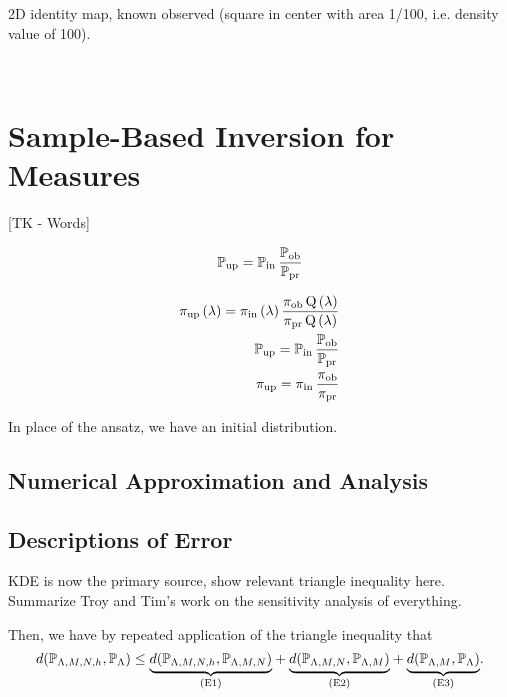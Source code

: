 2D identity map, known observed (square in center with area 1/100, i.e. density value of 100).

\vspace{3in}




\
\section{Sample-Based Inversion for Measures}\label{sec:ch02-sample}
[TK - Words]

\begin{equation}
\operatorname*{\mathbb{P}_{up}} = \operatorname*{\mathbb{P}_{in}} \frac{\operatorname*{\mathbb{P}_{ob}}}{\operatorname*{\mathbb{P}_{pr}}}
\end{equation}

\begin{equation}
\begin{split}
\operatorname*{\operatorname*{\pi_{up}}\left ( \lambda \right ) = \operatorname*{\pi_{in}}\left ( \lambda \right ) \frac{\operatorname*{\pi_{ob}}Q\left ( \lambda \right )}{\operatorname*{\pi_{pr}}Q\left ( \lambda \right )}}\\
\operatorname*{\operatorname*{\mathbb{P}_{up}} = \operatorname*{\mathbb{P}_{in}} \frac{\operatorname*{\mathbb{P}_{ob}}}{\operatorname*{\mathbb{P}_{pr}}}}\\
\operatorname*{\operatorname*{\pi_{up}} = \operatorname*{\pi_{in}} \frac{\operatorname*{\pi_{ob}}}{\operatorname*{\pi_{pr}}}}
\end{split}
\end{equation}

In place of the ansatz, we have an initial distribution.

\subsection{Numerical Approximation and Analysis}\label{sec:sample-approx}


\vspace{2in}

\subsection{Descriptions of Error}\label{sec:sample-error}

KDE is now the primary source, show relevant triangle inequality here.
Summarize Troy and Tim's work on the sensitivity analysis of everything.


Then, we have by repeated application of the triangle inequality that
\begin{equation}
\label{eq:sample-triangleineq}
d(\PP_{\pspace, \ndiscs, \nsamps, h}, \paramP) \leq 
\underset{ \text{(E1)} }{\underbrace{d(\PP_{\pspace, \ndiscs, \nsamps, h},\PP_{\pspace, \ndiscs, \nsamps})}} + 
\underset{ \text{(E2)} }{\underbrace{d(\PP_{\pspace, \ndiscs, \nsamps}, \PP_{\pspace, \ndiscs}) }}+ 
\underset{ \text{(E3)} }{\underbrace{d(\PP_{\pspace, \ndiscs}, \paramP) }}.
\end{equation}


